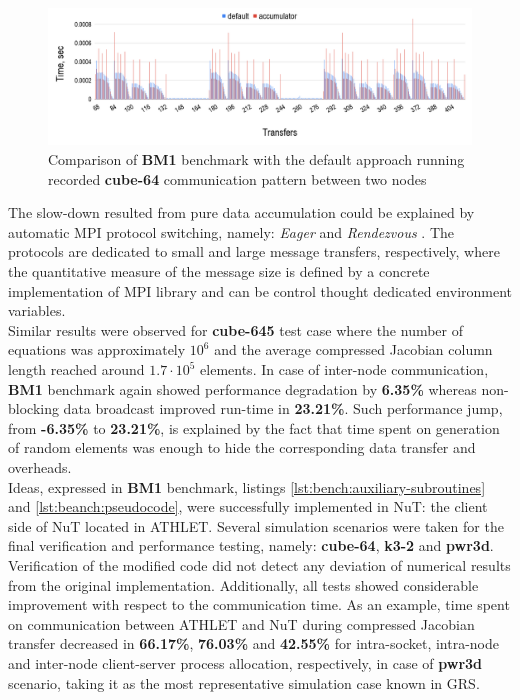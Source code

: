 \begin{figure}[htpb]
  \centering
  \includegraphics[width=1.0\textwidth]{figures/chapter-3/benchmark-result-non-blocking-inter-node-comm.png}
  \caption{Comparison of \textbf{BM1} benchmark with the default approach running recorded \textbf{cube-64} communication pattern between two nodes}
\label{fig:benchmark:results-cube-64-inter-node-comm}
\end{figure}


The slow-down resulted from pure data accumulation could be explained by automatic MPI protocol switching, namely: \textit{Eager} and \textit{Rendezvous} \cite{mpi:protocols-explanation}. The protocols are dedicated to small and large message transfers, respectively, where the quantitative measure of the message size is defined by a concrete implementation of MPI library and can be control thought dedicated environment variables.\\



Similar results were observed for \textbf{cube-645} test case where the number of equations was approximately $10^6$ and the average compressed Jacobian column length reached around $1.7 \cdot 10^5$ elements. In case of inter-node communication, \textbf{BM1} benchmark again showed performance degradation by \textbf{6.35\%} whereas non-blocking data broadcast improved run-time in \textbf{23.21\%}. Such performance jump, from \textbf{-6.35\%} to \textbf{23.21\%}, is explained by the fact that time spent on generation of random elements was enough to hide the corresponding data transfer and overheads.\\


Ideas, expressed in \textbf{BM1} benchmark, listings \ref{lst:bench:auxiliary-subroutines} and \ref{lst:beanch:pseudocode}, were successfully implemented in NuT: the client side of NuT located in ATHLET. Several simulation scenarios were taken for the final verification and performance testing, namely: \textbf{cube-64}, \textbf{k3-2} and \textbf{pwr3d}. Verification of the modified code did not detect any deviation of numerical results from the original implementation. Additionally, all tests showed considerable improvement with respect to the communication time. As an example, time spent on communication between ATHLET and NuT during compressed Jacobian transfer decreased in \textbf{66.17\%}, \textbf{76.03\%} and \textbf{42.55\%} for intra-socket, intra-node and inter-node client-server process allocation, respectively, in case of \textbf{pwr3d} scenario, taking it as the most representative simulation case known in GRS.\\


